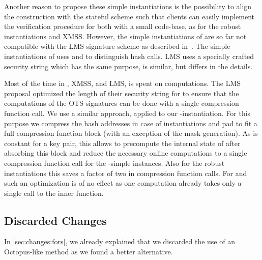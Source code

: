 Another reason to propose these simple instantiations is the possibility to align the construction
with the stateful scheme \cite{LMSdraft} such that clients can easily implement the verification
procedure for both with a small code-base, as for the robust instantiations and XMSS. However, the simple instantiations of \spx are so far not compatible with the LMS signature scheme as described in~\cite{LMSdraft}. The simple instantiations of \spx uses \pseed and \adrs to distinguish hash calls. LMS uses a specially crafted security string which has the same purpose, is similar, but differs in the details.

Most of the time in \spx, XMSS, and LMS, is spent on \sphincsF computations. The LMS proposal \cite{LMSdraft} optimized the length of their security string for \shatwo to ensure that the \sphincsF computations of the OTS signatures can be done with a single compression function call.
We use a similar approach, applied to our \spx-\shatwo instantiation. For this purpose we compress the hash addresses in case of \shatwo instantiations and pad \pseed to fit a full compression function block (with an exception of the mask generation). As \pseed is constant for a key pair, this allows to precompute the internal state of \shatwo after absorbing this block and reduce the necessary online computations to a single compression function call for the \shatwo-simple instances. Also for the robust instantiations this saves a factor of two in compression function calls. For \shathree and \haraka such an optimization is of no effect as one \sphincsF computation already takes only a single call to the inner function.

\subsection{Discarded Changes}
In \autoref{sec:changes:fors}, we already explained that we discarded the use of
an Octopus-like method as we found a better alternative.

